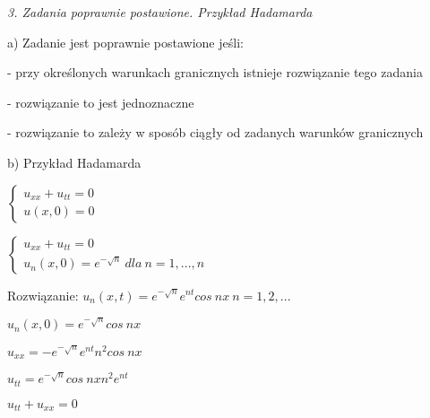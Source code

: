 \textit{3. Zadania poprawnie postawione. Przykład Hadamarda}

a) Zadanie jest poprawnie postawione jeśli:

  - przy określonych warunkach granicznych istnieje rozwiązanie tego zadania
  
  - rozwiązanie to jest jednoznaczne

  - rozwiązanie to zależy w sposób ciągły od zadanych warunków granicznych

b) Przykład Hadamarda

$\left\{\begin{matrix} u_{xx} + u_{tt} = 0 \\ u(x,0) = 0 \end{matrix}\right.$

$\left\{\begin{matrix} u_{xx} + u_{tt} = 0 \\ u_n(x,0) = e^{-\sqrt{n}}\ dla\ n = 1, ..., n \end{matrix}\right.$

Rozwiązanie: $u_n(x,t) = e^{-\sqrt{n}}e^{nt}cos\ nx\  n = 1, 2, ...$

$u_n(x,0) = e^{-\sqrt{n}}cos\ nx$

$u_{xx} = -e^{-\sqrt{n}}e^{nt}n^2cos\ nx$

$u_{tt} = e^{-\sqrt{n}}cos\ nx n^2 e^{nt}$

$u_{tt} + u_{xx} = 0$

